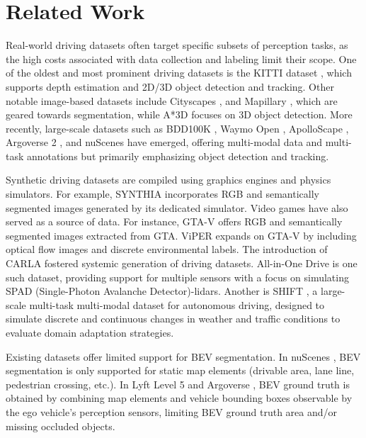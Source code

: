 \section{Related Work} \label{sec:related-work}

Real-world driving datasets often target specific subsets of perception tasks, as the high costs associated with data collection and labeling limit their scope. One of the oldest and most prominent driving datasets is the KITTI dataset \cite{geiger2013vision}, which supports depth estimation and 2D/3D object detection and tracking. Other notable image-based datasets include Cityscapes \cite{cordts2016cityscapes}, and Mapillary \cite{neuhold2017mapillary}, which are geared towards segmentation, while A*3D \cite{pham20203d} focuses on 3D object detection. More recently, large-scale datasets such as BDD100K \cite{yu2020bdd100k}, Waymo Open \cite{sun2020scalability}, ApolloScape \cite{huang2018apolloscape}, Argoverse 2 \cite{wilson2023argoverse}, and nuScenes \cite{caesar2020nuscenes} have emerged, offering multi-modal data and multi-task annotations but primarily emphasizing object detection and tracking.

Synthetic driving datasets are compiled using graphics engines and physics simulators. For example, SYNTHIA \cite{ros2016synthia} incorporates RGB and semantically segmented images generated by its dedicated simulator. Video games have also served as a source of data. For instance, GTA-V \cite{richter2016playing} offers RGB and semantically segmented images extracted from GTA. ViPER \cite{simon2005viper} expands on GTA-V by including optical flow images and discrete environmental labels. The introduction of CARLA \cite{dosovitskiy2017carla} fostered systemic generation of driving datasets. All-in-One Drive \cite{weng2023all} is one such dataset, providing support for multiple sensors with a focus on simulating SPAD (Single-Photon Avalanche Detector)-lidars. Another is SHIFT \cite{sun2022shift}, a large-scale multi-task multi-modal dataset for autonomous driving, designed to simulate discrete and continuous changes in weather and traffic conditions to evaluate domain adaptation strategies.

Existing datasets offer limited support for BEV segmentation. In nuScenes \cite{caesar2020nuscenes}, BEV segmentation is only supported for static map elements (drivable area, lane line, pedestrian crossing, etc.). In Lyft Level 5 \cite{houston2021one} and Argoverse \cite{chang2019argoverse, wilson2023argoverse}, BEV ground truth is obtained by combining map elements and vehicle bounding boxes observable by the ego vehicle's perception sensors, limiting BEV ground truth area and/or missing occluded objects.

